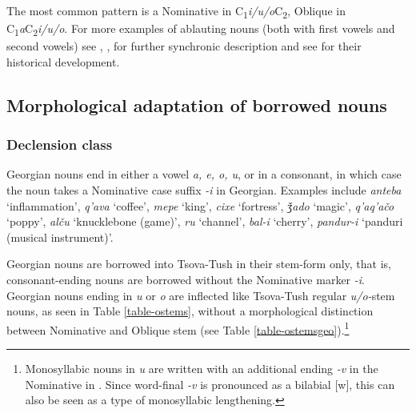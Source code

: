 The most common pattern is a Nominative in C\textsubscript{1}\textit{i/u/o}C\textsubscript{2}, Oblique in C\textsubscript{1}\textit{a}C\textsubscript{2}\textit{i/u/o}. For more examples of ablauting nouns (both with first vowels and second vowels) see \textcite[9]{haukharris}, \textcite[68]{desheriev53}, \textcite[107]{mikeladze11} for further synchronic description and see \textcite{schrijver21nakh} for their historical development.


\subsection{Morphological adaptation of borrowed nouns} \label{morphadapt}

\subsubsection{Declension class} \label{decladapt} 

Georgian nouns end in either a vowel \textit{a, e, o, u}, or in a consonant, in which case the noun takes a Nominative case suffix \textit{-i} in Georgian. Examples include \textit{anteba} `inflammation', \textit{q'ava} `coffee', \textit{mepe} `king', \textit{cixe} `fortress', \textit{ǯado} `magic', \textit{q'aq'ačo} `poppy', \textit{alču} `knucklebone (game)', \textit{ru} `channel', \textit{bal-i} `cherry', \textit{pandur-i} `panduri (musical instrument)'.

Georgian nouns are borrowed into Tsova-Tush in their stem-form only, that is, consonant-ending nouns are borrowed without the Nominative marker \textit{-i}. Georgian nouns ending in \textit{u} or \textit{o} are inflected like Tsova-Tush regular \textit{u/o-}stem nouns, as seen in Table \ref{table-ostems}, without a morphological distinction between Nominative and Oblique stem (see Table \ref{table-ostemsgeo}).\footnote{Monosyllabic nouns in \textit{u} are written with an additional ending \textit{-v} in the Nominative in \textcite{kadkad84}. Since word-final \textit{-v} is pronounced as a bilabial [w], this can also be seen as a type of monosyllabic lengthening.} 


